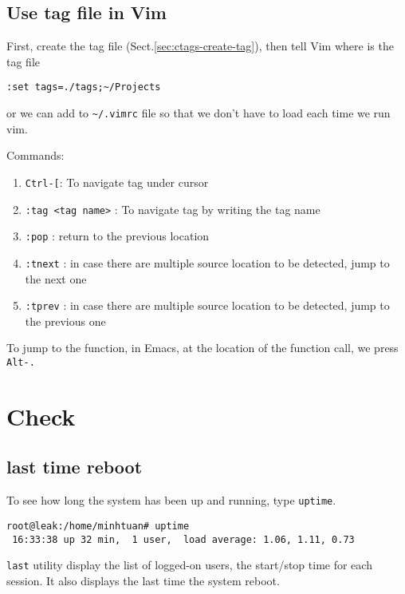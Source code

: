 \subsection{Use tag file in Vim}
\label{sec:ctags-vim}

First, create the tag file (Sect.\ref{sec:ctags-create-tag}), then tell Vim
where is the tag file
\begin{verbatim}
:set tags=./tags;~/Projects
\end{verbatim}
or we can add to \verb!~/.vimrc! file so that we don't have to load each time we
run vim.

Commands:
\begin{enumerate}
  \item \verb!Ctrl-[!: To navigate tag under cursor
  \item \verb!:tag <tag name>! : To navigate tag by writing the tag name
  \item \verb!:pop! : return to the previous location
  \item \verb!:tnext! : in case there are multiple source location to be
  detected, jump to the next one
  \item \verb!:tprev! : in case there are multiple source location to be
  detected, jump to the previous one
\end{enumerate}

\begin{framed}
To jump to the function, in Emacs, at the location of the function call, we
press \verb!Alt-.!

\end{framed}


\section{Check}

\subsection{last time reboot}

To see how long the system has been up and running, type \verb!uptime!.
\begin{verbatim}
root@leak:/home/minhtuan# uptime
 16:33:38 up 32 min,  1 user,  load average: 1.06, 1.11, 0.73
\end{verbatim}

\verb!last! utility display the list of logged-on users, the start/stop time for
each session. It also displays the last time the system reboot.

